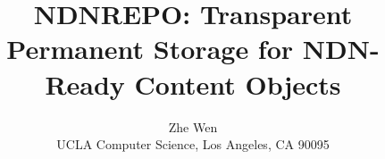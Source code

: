 \documentclass{sig-alternate-10pt}
\begin{document}
\title{NDNREPO: Transparent Permanent Storage for NDN-Ready Content Objects}



\author{Zhe Wen\\
UCLA Computer Science, Los Angeles, CA 90095}

\maketitle

\begin{sloppypar}




%



%
%
%
%







\small
\balance

%
%

%


\end{sloppypar}
\end{document}
